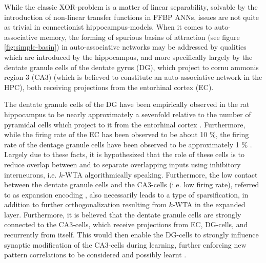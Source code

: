 
While the classic XOR-problem is a matter of linear separability, solvable by the introduction of non-linear transfer functions in FFBP ANNs, issues are not quite as trivial in connectionist hippocampus-models. When it comes to auto-associative memory, the forming of spurious basins of attraction (see figure \ref{fig:simple-basin}) in auto-associative networks may be addressed by qualities which are introduced by the hippocampus, and more specifically largely by the dentate granule cells of the dentate gyrus (DG), which project to cornu ammonis region 3 (CA3) (which is believed to constitute an auto-associative network in the HPC), both receiving projections from the entorhinal cortex (EC).

The dentate granule cells of the DG have been empirically observed in the rat hippocampus to be nearly approximately a sevenfold relative to the number of pyramidal cells which project to it from the entorhinal cortex \citep{Rolls1998chpt6}. Furthermore, while the firing rate of the EC has been observed to be about 10 \%, the firing rate of the dentage granule cells have been observed to be approximately 1 \% \citep{Rolls1998chpt6}.
Largely due to these facts, it is hypothesized that the role of these cells is to reduce overlap between and to separate overlapping inputs using inhibitory interneurons, i.e. $k$-WTA algorithmically speaking. Furthermore, the low contact between the dentate granule cells and the CA3-cells (i.e. low firing rate), referred to as expansion encoding \citep{Rolls1998chpt6}, also necessarily leads to a type of sparsification, in addition to further orthogonalization resulting from $k$-WTA in the expanded layer. Furthermore, it is believed that the dentate granule cells are strongly connected to the CA3-cells, which receive projections from EC, DG-cells, and recurrently from itself. This would then enable the DG-cells to strongly influence synaptic modification of the CA3-cells during learning, further enforcing new pattern correlations to be considered and possibly learnt \citep{Rolls1998chpt6}.

